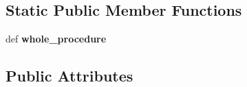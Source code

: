 \subsection*{Static Public Member Functions}
\begin{DoxyCompactItemize}
\item 
\hypertarget{classsrc_1_1core_1_1execution_1_1DownloadEnsemblSeq_1_1DownloadEnsemblSeq_aa94be4155b154d0ce7792e5ab9c25cc4}{def {\bfseries whole\-\_\-procedure}}\label{classsrc_1_1core_1_1execution_1_1DownloadEnsemblSeq_1_1DownloadEnsemblSeq_aa94be4155b154d0ce7792e5ab9c25cc4}

\end{DoxyCompactItemize}
\subsection*{Public Attributes}

